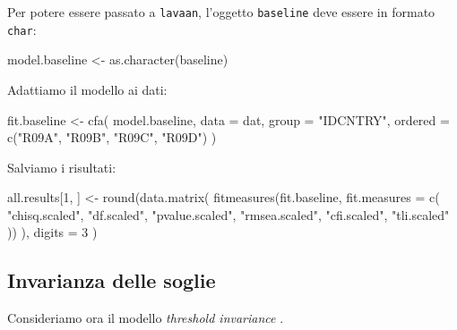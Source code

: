 \documentclass[
  11pt,
]{krantz}
\makeatletter
\newenvironment{Shaded}{\begin{snugshade}}{\end{snugshade}}
\newcommand{\AttributeTok}[1]{\textcolor[rgb]{0.61,0.61,0.61}{#1}}
\newcommand{\DecValTok}[1]{\textcolor[rgb]{0.06,0.06,0.06}{#1}}
\newcommand{\FunctionTok}[1]{\textcolor[rgb]{0,0,0}{#1}}
\newcommand{\NormalTok}[1]{#1}
\newcommand{\OtherTok}[1]{\textcolor[rgb]{0.37,0.37,0.37}{#1}}
\newcommand{\StringTok}[1]{\textcolor[rgb]{0.5,0.5,0.5}{#1}}
\newenvironment{kframe}{%
\medskip{}
\setlength{\fboxsep}{.8em}
 \def\at@end@of@kframe{}%
 \ifinner\ifhmode%
  \def\at@end@of@kframe{\end{minipage}}%
  \begin{minipage}{\columnwidth}%
 \fi\fi%
 \def\FrameCommand##1{\hskip\@totalleftmargin \hskip-\fboxsep
 \colorbox{shadecolor}{##1}\hskip-\fboxsep
     \hskip-\linewidth \hskip-\@totalleftmargin \hskip\columnwidth}%
 \MakeFramed {\advance\hsize-\width
   \@totalleftmargin\z@ \linewidth\hsize
   \@setminipage}}%
 {\par\unskip\endMakeFramed%
 \at@end@of@kframe}
\renewenvironment{Shaded}{\begin{kframe}}{\end{kframe}}
\theoremstyle{definition}
\theoremstyle{definition}
\theoremstyle{definition}
\theoremstyle{definition}
\theoremstyle{remark}
\makeatother
\begin{document}
Per potere essere passato a \texttt{lavaan}, l'oggetto \texttt{baseline} deve essere in formato \texttt{char}:

\begin{Shaded}
\begin{Highlighting}[]
\NormalTok{model.baseline }\OtherTok{\textless{}{-}} \FunctionTok{as.character}\NormalTok{(baseline)}
\end{Highlighting}
\end{Shaded}

Adattiamo il modello ai dati:

\begin{Shaded}
\begin{Highlighting}[]
\NormalTok{fit.baseline }\OtherTok{\textless{}{-}} \FunctionTok{cfa}\NormalTok{(}
\NormalTok{  model.baseline,}
  \AttributeTok{data =}\NormalTok{ dat,}
  \AttributeTok{group =} \StringTok{"IDCNTRY"}\NormalTok{,}
  \AttributeTok{ordered =} \FunctionTok{c}\NormalTok{(}\StringTok{"R09A"}\NormalTok{, }\StringTok{"R09B"}\NormalTok{, }\StringTok{"R09C"}\NormalTok{, }\StringTok{"R09D"}\NormalTok{)}
\NormalTok{)}
\end{Highlighting}
\end{Shaded}

Salviamo i risultati:

\begin{Shaded}
\begin{Highlighting}[]
\NormalTok{all.results[}\DecValTok{1}\NormalTok{, ] }\OtherTok{\textless{}{-}}
  \FunctionTok{round}\NormalTok{(}\FunctionTok{data.matrix}\NormalTok{(}
    \FunctionTok{fitmeasures}\NormalTok{(fit.baseline, }\AttributeTok{fit.measures =} \FunctionTok{c}\NormalTok{(}
      \StringTok{"chisq.scaled"}\NormalTok{, }\StringTok{"df.scaled"}\NormalTok{, }\StringTok{"pvalue.scaled"}\NormalTok{,}
      \StringTok{"rmsea.scaled"}\NormalTok{, }\StringTok{"cfi.scaled"}\NormalTok{, }\StringTok{"tli.scaled"}
\NormalTok{    ))}
\NormalTok{  ),}
  \AttributeTok{digits =} \DecValTok{3}
\NormalTok{  )}
\end{Highlighting}
\end{Shaded}

\hypertarget{invarianza-delle-soglie}{%
\subsection{Invarianza delle soglie}\label{invarianza-delle-soglie}}

Consideriamo ora il modello \emph{threshold invariance} \citep[chiamata \emph{Proposition 4} da][]{wu2016identification}.
\end{document}
